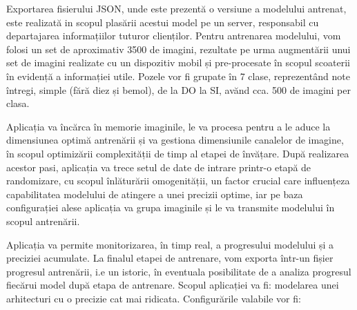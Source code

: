	Exportarea fisierului JSON, unde este prezentă o versiune a modelului antrenat, este realizată in scopul plasării acestui model pe un server, responsabil cu departajarea informațiilor tuturor clienților. 
	Pentru antrenarea modelului, vom folosi un set de aproximativ 3500 de imagini, rezultate pe urma augmentării  unui set de imagini realizate cu un dispozitiv mobil și pre-procesate în scopul scoaterii în evidență a informației utile. Pozele vor fi grupate în  7 clase, reprezentând note întregi, simple (fără diez și bemol), de la DO la SI, avănd cca. 500 de imagini per clasa. 
	
	Aplicația va încărca în memorie imaginile, le va procesa pentru a le aduce la dimensiunea optimă antrenării și va gestiona dimensiunile canalelor de imagine, în scopul optimizării complexității de timp al etapei de învățare. După realizarea acestor pasi, aplicația va trece setul de date de intrare printr-o etapă de randomizare, cu scopul înlăturării omogenității, un factor crucial care influențeza capabilitatea modelului de atingere a unei precizii optime, iar pe baza configurației alese aplicația va grupa imaginile și le va transmite modelului în scopul antrenării.
	
	Aplicația va permite monitorizarea, în timp real, a progresului modelului și a preciziei acumulate. La finalul etapei de antrenare, vom exporta într-un fișier progresul antrenării, i.e un istoric, în eventuala posibilitate de a analiza progresul fiecărui model după etapa de antrenare.
	Scopul aplicației va fi: modelarea unei arhitecturi cu o precizie cat mai ridicata.
	Configurările valabile vor fi:
	
